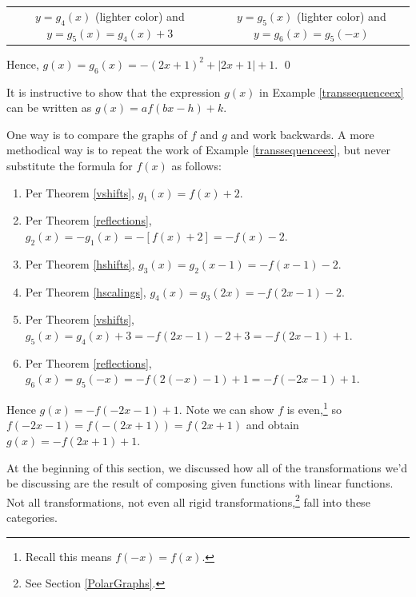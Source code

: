 \documentclass{ximera}
\begin{document}
\begin{example}
\begin{enumerate}
\begin{center}
\begin{tabular}{cc}
$y=g_{4}(x)$ (lighter color) and $y=g_{5}(x) = g_{4}(x)+3$ &  $y = g_{5}(x)$ (lighter color) and $y = g_{6}(x) = g_{5}(-x)$ \\

\end{tabular}

\end{center} 

\end{enumerate}

Hence, $g(x) = g_{6}(x) = -(2x+1)^2+|2x+1| + 1$.  \qed
 
\end{example}

It is instructive to show that the expression $g(x)$ in Example \ref{transsequenceex}  can be written as $g(x) = a f(bx-h)+k$.  

\smallskip

One way is to compare the graphs of $f$ and $g$ and work backwards.  A more methodical way is to repeat the work of Example \ref{transsequenceex}, but never substitute the formula for $f(x)$ as follows:


\begin{enumerate}

\item  Per Theorem \ref{vshifts}, $g_{1}(x) = f(x) + 2$.

\item  Per Theorem \ref{reflections}, $g_{2}(x) = -g_{1}(x) =  -[f(x) + 2] = -f(x)-2$.

\item  Per Theorem \ref{hshifts}, $g_{3}(x) = g_{2}(x-1) = -f(x-1)-2$.

\item  Per Theorem \ref{hscalings}, $g_{4}(x) = g_{3}(2x) =-f(2x-1)-2$.

\item  Per Theorem \ref{vshifts}, $g_{5}(x) = g_{4}(x)+3 = -f(2x-1)-2 + 3 = -f(2x-1)+1$.

\item  Per Theorem \ref{reflections}, $g_{6}(x) = g_{5}(-x) =  -f(2(-x)-1)+1 = -f(-2x-1)+1$.

\end{enumerate}

Hence $g(x) =  -f(-2x-1)+1$.  Note we can show $f$ is even,\footnote{Recall this means $f(-x) = f(x)$.} so $f(-2x-1) = f(-(2x+1)) = f(2x+1)$ and obtain $g(x) = -f(2x+1)+1$.  


At the beginning of this section, we discussed how all of the transformations we'd be discussing are the result of composing given functions with linear functions.  Not all transformations, not even all rigid transformations,\footnote{See Section \ref{PolarGraphs}.} fall into these categories.  
\end{document}
